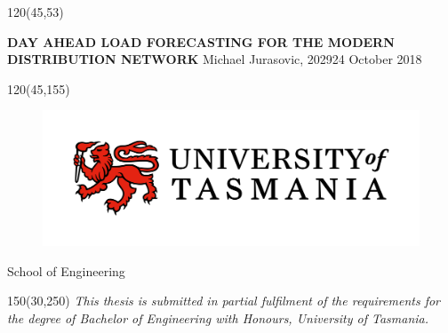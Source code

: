 \begin{textblock}{120}(45,53) %
\noindent\begin{minipage}[t][55mm][c]{\textwidth} 
\centering \Large  %
\vspace*{\fill}
{\bf DAY AHEAD LOAD FORECASTING FOR THE MODERN DISTRIBUTION NETWORK}
\vfill
Michael Jurasovic, 202924
\vfill
\large October 2018
\vspace*{\fill}
\end{minipage}
\end{textblock}

\begin{textblock}{120}(45,155)
\centering
\begin{figure}[h]
\centering\includegraphics[width=0.75\linewidth]{images/UTAS-Logo-colour-2018.jpg}
\end{figure}
\vspace{2cm}
\Large
School of Engineering


\end{textblock}


\begin{textblock}{150}(30,250)
\centering
\emph{This thesis is submitted in partial fulfilment of the requirements for the degree of
Bachelor of Engineering with Honours,
University of Tasmania.}
\end{textblock}



\null\cleardoublepage
{}
